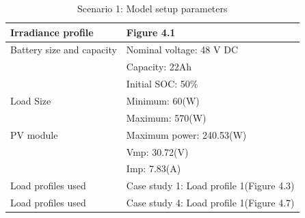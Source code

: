 	\begin{table}[!ht]
	\begin{center}
		\caption{Scenario 1: Model setup parameters}
		\begin{tabular}{|p{6cm}|p{8cm}|} %
			\hline
			\textbf{Irradiance profile } & \textbf{Figure 4.1}\\
			\hline
			Battery size and capacity	& Nominal voltage: 48 V DC \\
										& Capacity: 22Ah\\
					  					& Initial SOC: 50\% \\
					  					\hline
			Load Size 					& Minimum: 60(W)\\
					 					& Maximum: 570(W)\\
										\hline
			PV module		 			& Maximum power: 240.53(W)\\
										& Vmp: 30.72(V)\\
										& Imp: 7.83(A)\\
										\hline
			Load profiles used & Case study 1: Load profile 1(Figure 4.3)\\
			\hline
			Load profiles used & Case study 4: Load profile 1(Figure 4.7)\\
			\hline
		\end{tabular}
	\end{center}
\end{table}
